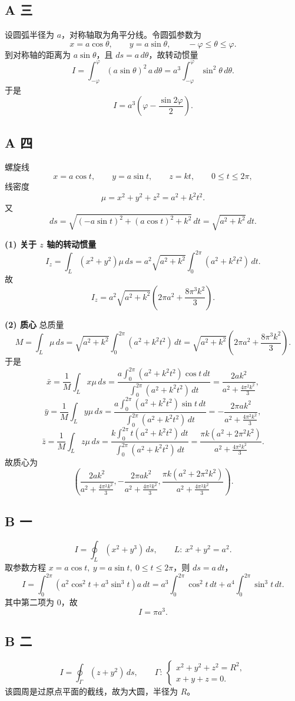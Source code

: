 \documentclass[12pt,a4paper]{ctexart}
\begin{document}
\subsection*{A 三}
设圆弧半径为 $a$，对称轴取为角平分线。令圆弧参数为
\[
x=a\cos\theta,\qquad y=a\sin\theta,\qquad -\varphi\le \theta\le \varphi.
\]
到对称轴的距离为 $a\sin\theta$，且 $ds=a\,d\theta$，故转动惯量
\[
I=\int_{-\varphi}^{\varphi}(a\sin\theta)^2\,a\,d\theta
=a^3\int_{-\varphi}^{\varphi}\sin^2\theta\,d\theta.
\]
于是
\[
I=a^3\left(\varphi-\frac{\sin 2\varphi}{2}\right).
\]

\subsection*{A 四}
螺旋线
\[
x=a\cos t,\qquad y=a\sin t,\qquad z=kt,\qquad 0\le t\le 2\pi,
\]
线密度
\[
\mu=x^2+y^2+z^2=a^2+k^2t^2.
\]
又
\[
ds=\sqrt{(-a\sin t)^2+(a\cos t)^2+k^2}\,dt=\sqrt{a^2+k^2}\,dt.
\]

\textbf{(1) 关于 $z$ 轴的转动惯量}
\[
I_z=\int_L (x^2+y^2)\mu\,ds
=a^2\sqrt{a^2+k^2}\int_0^{2\pi}(a^2+k^2t^2)\,dt.
\]
故
\[
I_z=a^2\sqrt{a^2+k^2}\left(2\pi a^2+\frac{8\pi^3k^2}{3}\right).
\]

\textbf{(2) 质心}
总质量
\[
M=\int_L \mu\,ds
=\sqrt{a^2+k^2}\int_0^{2\pi}(a^2+k^2t^2)\,dt
=\sqrt{a^2+k^2}\left(2\pi a^2+\frac{8\pi^3k^2}{3}\right).
\]
于是
\[
\bar x=\frac{1}{M}\int_L x\mu\,ds
=\frac{a\int_0^{2\pi}(a^2+k^2t^2)\cos t\,dt}{\int_0^{2\pi}(a^2+k^2t^2)\,dt}
=\frac{2ak^2}{a^2+\frac{4\pi^2k^2}{3}},
\]
\[
\bar y=\frac{1}{M}\int_L y\mu\,ds
=\frac{a\int_0^{2\pi}(a^2+k^2t^2)\sin t\,dt}{\int_0^{2\pi}(a^2+k^2t^2)\,dt}
=-\frac{2\pi ak^2}{a^2+\frac{4\pi^2k^2}{3}},
\]
\[
\bar z=\frac{1}{M}\int_L z\mu\,ds
=\frac{k\int_0^{2\pi}t(a^2+k^2t^2)\,dt}{\int_0^{2\pi}(a^2+k^2t^2)\,dt}
=\frac{\pi k(a^2+2\pi^2k^2)}{a^2+\frac{4\pi^2k^2}{3}}.
\]
故质心为
\[
\left(
\frac{2ak^2}{a^2+\frac{4\pi^2k^2}{3}},
-\frac{2\pi ak^2}{a^2+\frac{4\pi^2k^2}{3}},
\frac{\pi k(a^2+2\pi^2k^2)}{a^2+\frac{4\pi^2k^2}{3}}
\right).
\]

\subsection*{B 一}
\[
I=\oint_L (x^2+y^3)\,ds,\qquad L:\ x^2+y^2=a^2.
\]
取参数方程 $x=a\cos t,\ y=a\sin t,\ 0\le t\le 2\pi$，则 $ds=a\,dt$，
\[
I=\int_0^{2\pi}(a^2\cos^2 t+a^3\sin^3 t)a\,dt
=a^3\int_0^{2\pi}\cos^2 t\,dt+a^4\int_0^{2\pi}\sin^3 t\,dt.
\]
其中第二项为 $0$，故
\[
I=\pi a^3.
\]

\subsection*{B 二}
\[
I=\oint_\Gamma (z+y^2)\,ds,
\qquad
\Gamma:\ \begin{cases}
x^2+y^2+z^2=R^2,\\
x+y+z=0.
\end{cases}
\]
该圆周是过原点平面的截线，故为大圆，半径为 $R$。
\end{document}
